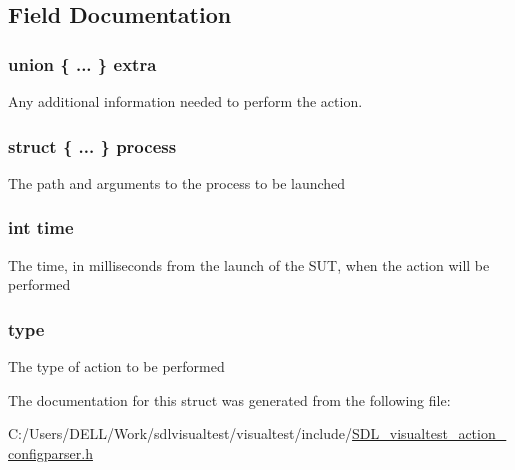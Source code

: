 \subsection{Field Documentation}
\hypertarget{struct_s_d_l_visual_test___action_a4626514a67f261290b54fb3d85ca8ddd}{
\subsubsection[{extra}]{\setlength{\rightskip}{0pt plus 5cm}union \{ ... \}   extra}}\label{struct_s_d_l_visual_test___action_a4626514a67f261290b54fb3d85ca8ddd}
Any additional information needed to perform the action. \hypertarget{struct_s_d_l_visual_test___action_aa43e9883c9f24718f49b984b67b1afdc}{
\subsubsection[{process}]{\setlength{\rightskip}{0pt plus 5cm}struct \{ ... \}   process}}\label{struct_s_d_l_visual_test___action_aa43e9883c9f24718f49b984b67b1afdc}
The path and arguments to the process to be launched \hypertarget{struct_s_d_l_visual_test___action_a42715f65f02da52edc5b22021d8ae670}{
\subsubsection[{time}]{\setlength{\rightskip}{0pt plus 5cm}int time}}\label{struct_s_d_l_visual_test___action_a42715f65f02da52edc5b22021d8ae670}
The time, in milliseconds from the launch of the S\-U\-T, when the action will be performed \hypertarget{struct_s_d_l_visual_test___action_a3ab091b672fc470015f09e6c4c50dcf1}{
\subsubsection[{type}]{ type}}\label{struct_s_d_l_visual_test___action_a3ab091b672fc470015f09e6c4c50dcf1}
The type of action to be performed 

The documentation for this struct was generated from the following file\-:\begin{DoxyCompactItemize}
\item 
C\-:/\-Users/\-D\-E\-L\-L/\-Work/sdlvisualtest/visualtest/include/\hyperlink{_s_d_l__visualtest__action__configparser_8h}{S\-D\-L\-\_\-visualtest\-\_\-action\-\_\-configparser.\-h}\end{DoxyCompactItemize}
